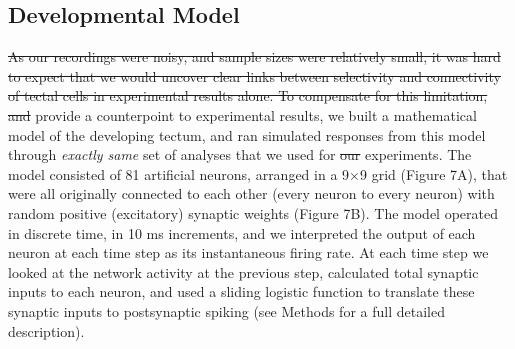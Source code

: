 \documentclass{article}
\providecommand{\DIFaddtex}[1]{{\protect\color{blue}{#1}}} %
\providecommand{\DIFdeltex}[1]{{\protect\color{red}\sout{#1}}}                      %
\providecommand{\DIFaddbegin}{} %
\providecommand{\DIFaddend}{} %
\providecommand{\DIFdelbegin}{} %
\providecommand{\DIFdelend}{} %
\providecommand{\DIFadd}[1]{\texorpdfstring{\DIFaddtex{#1}}{#1}} %
\providecommand{\DIFdel}[1]{\texorpdfstring{\DIFdeltex{#1}}{}} %
\newcommand{\DIFscaledelfig}{0.5}
\newlength{\DIFdelgraphicswidth} %
\newlength{\DIFdelgraphicsheight} %
\newcommand{\DIFaddincludegraphics}[2][]{{\color{blue}\fbox{\DIFOincludegraphics[#1]{#2}}}} %
\newcommand{\DIFdelincludegraphics}[2][]{%
\sbox{\DIFdelgraphicsbox}{\DIFOincludegraphics[#1]{#2}}%
\settoboxwidth{\DIFdelgraphicswidth}{\DIFdelgraphicsbox} %
\settoboxtotalheight{\DIFdelgraphicsheight}{\DIFdelgraphicsbox} %
\scalebox{\DIFscaledelfig}{%
\parbox[b]{\DIFdelgraphicswidth}{\usebox{\DIFdelgraphicsbox}\\[-\baselineskip] \rule{\DIFdelgraphicswidth}{0em}}\llap{\resizebox{\DIFdelgraphicswidth}{\DIFdelgraphicsheight}{%
\setlength{\unitlength}{\DIFdelgraphicswidth}%
\begin{picture}(1,1)%
\thicklines\linethickness{2pt} %
{\color[rgb]{1,0,0}\put(0,0){\framebox(1,1){}}}%
{\color[rgb]{1,0,0}\put(0,0){\line( 1,1){1}}}%
{\color[rgb]{1,0,0}\put(0,1){\line(1,-1){1}}}%
\end{picture}%
}\hspace*{3pt}}} %
} %
\DeclareRobustCommand{\DIFaddbegin}{\DIFOaddbegin \let\includegraphics\DIFaddincludegraphics} %
\DeclareRobustCommand{\DIFaddend}{\DIFOaddend \let\includegraphics\DIFOincludegraphics} %
\DeclareRobustCommand{\DIFdelbegin}{\DIFOdelbegin \let\includegraphics\DIFdelincludegraphics} %
\DeclareRobustCommand{\DIFdelend}{\DIFOaddend \let\includegraphics\DIFOincludegraphics} %
\begin{document}

\subsection*{Developmental Model}

\DIFdelbegin \DIFdel{As our recordings were noisy, and sample sizes were relatively small, it was hard to expect that we would uncover clear links between selectivity and connectivity of tectal cells in experimental results alone. To compensate for this limitation, and }\DIFdelend \DIFaddbegin \DIFadd{To }\DIFaddend provide a counterpoint to \DIFaddbegin \DIFadd{our }\DIFaddend experimental results, we built a mathematical model of the developing tectum, and ran simulated responses from this model through \DIFaddbegin \DIFadd{the  }\DIFaddend \textit{exactly same} set of analyses that we used for \DIFdelbegin \DIFdel{our }\DIFdelend \DIFaddbegin \DIFadd{biological }\DIFaddend experiments. The model consisted of 81 artificial neurons, arranged in a 9$\times$9 grid (Figure 7A), that were all originally connected to each other (every neuron to every neuron) with random positive (excitatory) synaptic weights (Figure 7B). The model operated in discrete time, in 10 ms increments, and we interpreted the output of each neuron at each time step as its instantaneous firing rate. At each time step we looked at the network activity at the previous step, calculated total synaptic inputs to each neuron, and used a sliding logistic function to translate these synaptic inputs to postsynaptic spiking (see Methods for a full detailed description).
\end{document}
